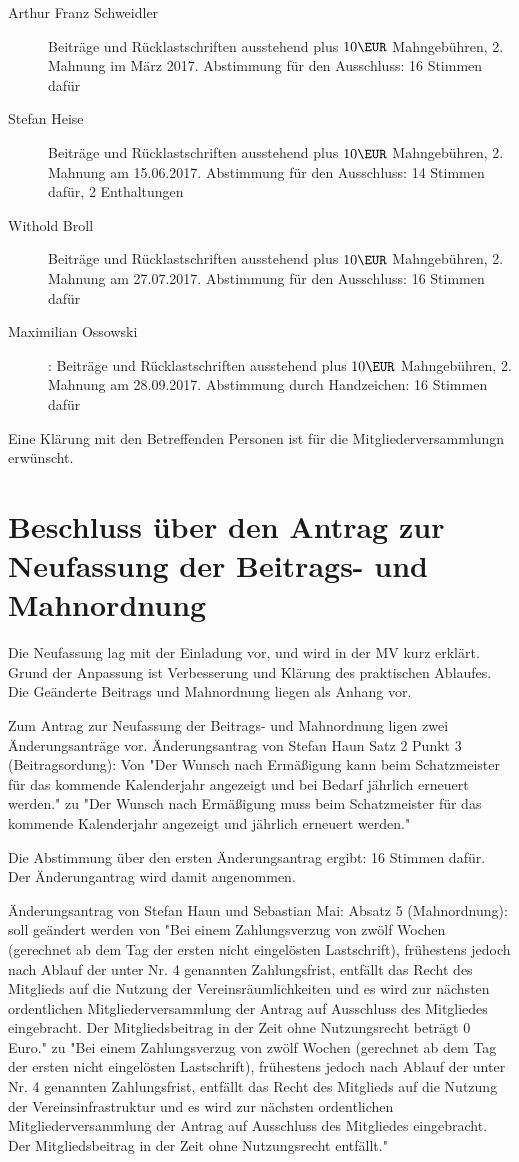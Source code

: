 \documentclass[a4paper,12pt,titlepage]{scrartcl}
\begin{document}
\begin{description}

\item[Arthur Franz Schweidler] Beiträge und Rücklastschriften ausstehend plus $10\EUR$ Mahngebühren, 2. Mahnung im März 2017. Abstimmung für den Ausschluss: 16 Stimmen dafür
\item[Stefan Heise] Beiträge und Rücklastschriften ausstehend plus $10\EUR$ Mahngebühren, 2. Mahnung am 15.06.2017. Abstimmung für den Ausschluss: 14 Stimmen dafür, 2 Enthaltungen
\item[Withold Broll] Beiträge und Rücklastschriften ausstehend plus $10\EUR$ Mahngebühren, 2. Mahnung am 27.07.2017. Abstimmung für den Ausschluss: 16 Stimmen dafür
\item[Maximilian Ossowski]: Beiträge und Rücklastschriften ausstehend plus $10\EUR$ Mahngebühren, 2. Mahnung am 28.09.2017. Abstimmung durch Handzeichen: 16 Stimmen dafür
\end{description}

Eine Klärung mit den Betreffenden Personen ist für die Mitgliederversammlungn erwünscht.


\section{Beschluss über den Antrag zur Neufassung der Beitrags- und Mahnordnung}

Die Neufassung lag mit der Einladung vor, und wird in der MV kurz erklärt. Grund der Anpassung ist Verbesserung und Klärung des praktischen Ablaufes. Die Geänderte Beitrags und Mahnordnung liegen als Anhang vor.
 
Zum Antrag zur Neufassung der Beitrags- und Mahnordnung ligen zwei Änderungsanträge vor.
Änderungsantrag von Stefan Haun Satz 2 Punkt 3 (Beitragsordung): Von 
"Der Wunsch nach Ermäßigung kann beim Schatzmeister für das
kommende Kalenderjahr angezeigt und bei Bedarf jährlich erneuert werden." zu 
"Der Wunsch nach Ermäßigung muss beim Schatzmeister für das
kommende Kalenderjahr angezeigt und jährlich erneuert werden."

Die Abstimmung über den ersten Änderungsantrag ergibt: 16 Stimmen dafür. Der Änderungantrag wird damit angenommen.

Änderungsantrag von Stefan Haun und Sebastian Mai: 
Absatz 5 (Mahnordnung): soll geändert werden von 
"Bei einem Zahlungsverzug von zwölf Wochen (gerechnet ab dem Tag der ersten nicht
eingelösten Lastschrift), frühestens jedoch nach Ablauf der unter Nr. 4 genannten
Zahlungsfrist, entfällt das Recht des Mitglieds auf die Nutzung der
Vereinsräumlichkeiten und es wird zur nächsten ordentlichen Mitgliederversammlung
der Antrag auf Ausschluss des Mitgliedes eingebracht. Der Mitgliedsbeitrag in der Zeit
ohne Nutzungsrecht beträgt 0 Euro." zu 
"Bei einem Zahlungsverzug von zwölf Wochen (gerechnet ab dem Tag der ersten nicht
eingelösten Lastschrift), frühestens jedoch nach Ablauf der unter Nr. 4 genannten
Zahlungsfrist, entfällt das Recht des Mitglieds auf die Nutzung der
Vereinsinfrastruktur und es wird zur nächsten ordentlichen Mitgliederversammlung
der Antrag auf Ausschluss des Mitgliedes eingebracht. Der Mitgliedsbeitrag in der Zeit ohne Nutzungsrecht entfällt."
\end{document}
